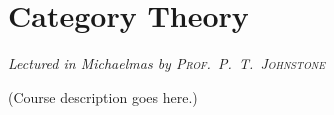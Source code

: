 \chapter[Category Theory \\ \textnormal{\emph{Lectured in Michaelmas \oldstylenums{2023} by \textsc{Prof.\ P.\ T.\ Johnstone}}}]{Category Theory}
\emph{\Large Lectured in Michaelmas  by \textsc{Prof.\ P.\ T.\ Johnstone}}

(Course description goes here.)


